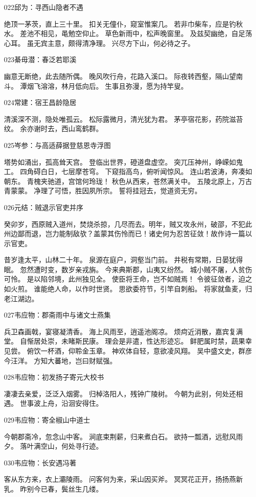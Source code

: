 022邱为：寻西山隐者不遇

绝顶一茅茨，直上三十里。
扣关无僮仆，窥室惟案几。
若非巾柴车，应是钓秋水。
差池不相见，黾勉空仰止。
草色新雨中，松声晚窗里。
及兹契幽绝，自足荡心耳。
虽无宾主意，颇得清净理。
兴尽方下山，何必待之子。

023綦毋潜：春泛若耶溪

幽意无断绝，此去随所偶。
晚风吹行舟，花路入溪口。
际夜转西壑，隔山望南斗。
潭烟飞溶溶，林月低向后。
生事且弥漫，愿为持竿叟。

024常建：宿王昌龄隐居

清溪深不测，隐处唯孤云。
松际露微月，清光犹为君。
茅亭宿花影，药院滋苔纹。
余亦谢时去，西山鸾鹤群。

025岑参：与高适薛据登慈恩寺浮图

塔势如涌出，孤高耸天宫。
登临出世界，磴道盘虚空。
突兀压神州，峥嵘如鬼工。
四角碍白日，七层摩苍穹。
下窥指高鸟，俯听闻惊风。
连山若波涛，奔凑如朝东。
青槐夹驰道，宫馆何玲珑！
秋色从西来，苍然满关中。
五陵北原上，万古青蒙蒙。
净理了可悟，胜因夙所宗。
誓将挂冠去，觉道资无穷。

026元结：贼退示官吏并序

癸卯岁，西原贼入道州，焚烧杀掠，几尽而去。明年，贼又攻永州，破邵，不犯此
州边鄙而退，岂力能制敌欤？盖蒙其伤怜而已！诸史何为忍苦征敛！故作诗一篇以
示官吏。

昔岁逢太平，山林二十年。
泉源在庭户，洞壑当门前。
井税有常期，日晏犹得眠。
忽然遭时变，数岁亲戎旃。
今来典斯郡，山夷又纷然。
城小贼不屠，人贫伤可怜。
是以陷邻境，此州独见全。
使臣将王命，岂不如贼焉！
令彼征敛者，迫之如火煎。
谁能绝人命，以作时世贤。
思欲委符节，引竿自刺船。
将家就鱼麦，归老江湖边。

027韦应物：郡斋雨中与诸文士燕集

兵卫森画戟，宴寝凝清香。
海上风雨至，逍遥池阁凉。
烦疴近消散，嘉宾复满堂。
自惭居处崇，未睹斯民康。
理会是非遣，性达形迹忘。
鲜肥属时禁，蔬果幸见尝。
俯饮一杯酒，仰聆金玉章。
神欢体自轻，意欲凌风翔。
吴中盛文史，群彦今汪洋。
方知大蕃地，岂曰财赋强。

028韦应物：初发扬子寄元大校书

凄凄去亲爱，泛泛入烟雾。
归棹洛阳人，残钟广陵树。
今朝为此别，何处还相遇。
世事波上舟，沿洄安得住。

029韦应物：寄全椒山中道士

今朝郡斋冷，忽念山中客。
涧底束荆薪，归来煮白石。
欲持一瓢酒，远慰风雨夕。
落叶满空山，何处寻行迹。

030韦应物：长安遇冯著

客从东方来，衣上灞陵雨。
问客何为来，采山因买斧。
冥冥花正开，扬扬燕新乳。
昨别今已春，鬓丝生几缕。

